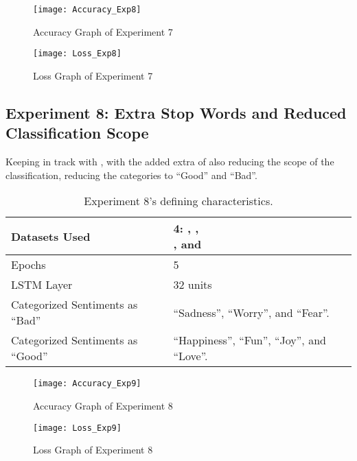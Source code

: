 \begin{figure}[!h]
	\centering
	\texttt{[image: Accuracy\_Exp8]}
	\caption{Accuracy Graph of Experiment 7}
	\label{fig:accuracy_exp8}
	\texttt{[image: Loss\_Exp8]}
	\caption{Loss Graph of Experiment 7}
	\label{fig:loss_exp8}
\end{figure}
\pagebreak

\subsection{Experiment 8: Extra Stop Words and Reduced Classification Scope}
\label{exp9}
Keeping in track with , with the added extra of also reducing the scope of the classification, reducing the categories to ``Good'' and ``Bad''.
\begin{table}[!h]
	\caption{Experiment 8's defining characteristics.}
	\vspace{0.5cm}
	\centering
	\begin{tabular}[t]{|l|l|}
	\hline
		Datasets Used & \makecell{4: \citet{d1}, \citet{d2},\\ \citet{d3}, and \citet{d4}}
	\\ \hline
		Epochs & 5
	\\ \hline
		LSTM Layer & 32 units
	\\ \hline
		Categorized Sentiments as ``Bad'' & ``Sadness'', ``Worry'', and ``Fear''.
	\\ \hline	
		Categorized Sentiments as ``Good'' & ``Happiness'', ``Fun'', ``Joy'', and ``Love''.
	\\ \hline
	\end{tabular}
\end{table}


\begin{figure}[!h]
	\centering
	\texttt{[image: Accuracy\_Exp9]}
	\caption{Accuracy Graph of Experiment 8}
	\label{fig:accuracy_exp9}
	\texttt{[image: Loss\_Exp9]}
	\caption{Loss Graph of Experiment 8}
	\label{fig:loss_exp9}
\end{figure}
\pagebreak

